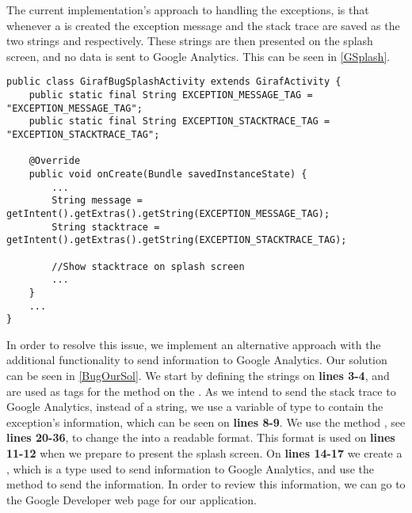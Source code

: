The current implementation's approach to handling the exceptions, is
that whenever a  is created the exception message
and the stack trace are saved as the two strings  and
 respectively. These strings are then presented on the splash
screen, and no data is sent to Google Analytics. This can be seen in
\autoref{GSplash}.\nl

\begin{minipage}[H]{\linewidth}
\begin{lstlisting}[caption = Code responsible for showing the GIRAF splash screen., label = GSplash]
public class GirafBugSplashActivity extends GirafActivity { 
	public static final String EXCEPTION_MESSAGE_TAG = "EXCEPTION_MESSAGE_TAG"; 
	public static final String EXCEPTION_STACKTRACE_TAG = "EXCEPTION_STACKTRACE_TAG";
	
	@Override
    public void onCreate(Bundle savedInstanceState) {
		...
		String message = getIntent().getExtras().getString(EXCEPTION_MESSAGE_TAG);
        String stacktrace = getIntent().getExtras().getString(EXCEPTION_STACKTRACE_TAG);
        
        //Show stacktrace on splash screen
        ...
    }	
	...
}
\end{lstlisting}
\end{minipage}


In order to resolve this issue, we implement an alternative approach with the
additional functionality to send information to Google Analytics. Our solution
can be seen in \autoref{BugOurSol}. We start by defining the strings on
\textbf{lines 3-4},  and  are
used as tags for the  method on the . As we
intend to send the stack trace to Google Analytics, instead of a string, we use
a variable of type  to contain the exception's information,
which can be seen on \textbf{lines 8-9}. We use the method
, see \textbf{lines 20-36}, to change the
 into a readable format. This format is used on \textbf{lines
11-12} when we prepare to present the splash screen. On \textbf{lines 14-17} we
create a , which is a type used to send information to Google
Analytics, and use the  method to send the information. In
order to review this information, we can go to the Google Developer web page for
our application.\nl

